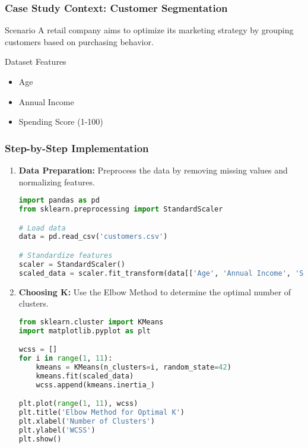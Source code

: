 \documentclass[aspectratio=169]{beamer}
\begin{document}
\begin{frame}[fragile]
    \frametitle{Case Study Context: Customer Segmentation}
    \begin{block}{Scenario}
        A retail company aims to optimize its marketing strategy by grouping customers based on purchasing behavior. 
    \end{block}
    \begin{block}{Dataset Features}
        \begin{itemize}
            \item Age
            \item Annual Income
            \item Spending Score (1-100)
        \end{itemize}
    \end{block}
\end{frame}

\begin{frame}[fragile]
    \frametitle{Step-by-Step Implementation}
    \begin{enumerate}
        \item \textbf{Data Preparation:} 
        Preprocess the data by removing missing values and normalizing features.
        \begin{lstlisting}[language=Python]
import pandas as pd
from sklearn.preprocessing import StandardScaler

# Load data
data = pd.read_csv('customers.csv')

# Standardize features
scaler = StandardScaler()
scaled_data = scaler.fit_transform(data[['Age', 'Annual Income', 'Spending Score']])
        \end{lstlisting}
        
        \item \textbf{Choosing K:} 
        Use the Elbow Method to determine the optimal number of clusters.
        \begin{lstlisting}[language=Python]
from sklearn.cluster import KMeans
import matplotlib.pyplot as plt

wcss = []
for i in range(1, 11):
    kmeans = KMeans(n_clusters=i, random_state=42)
    kmeans.fit(scaled_data)
    wcss.append(kmeans.inertia_)

plt.plot(range(1, 11), wcss)
plt.title('Elbow Method for Optimal K')
plt.xlabel('Number of Clusters')
plt.ylabel('WCSS')
plt.show()
        \end{lstlisting}
    \end{enumerate}
\end{frame}
\end{document}
